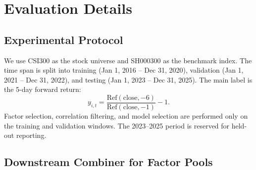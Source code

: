 



\section{Evaluation Details}
\label{sec:appendix_eval_details}

\subsection{Experimental Protocol}
\label{sec:appendix_exp_setup}

We use CSI300 as the stock universe and SH000300 as the benchmark index. The time span is split into training (Jan 1, 2016 -- Dec 31, 2020), validation (Jan 1, 2021 -- Dec 31, 2022), and testing (Jan 1, 2023 -- Dec 31, 2025). The main label is the 5-day forward return:
\begin{equation}
y_{i,t}=\frac{\mathrm{Ref}(\mathrm{close},-6)}{\mathrm{Ref}(\mathrm{close},-1)}-1.
\end{equation}
Factor selection, correlation filtering, and model selection are performed only on the training and validation windows. The 2023--2025 period is reserved for held-out reporting.

\subsection{Downstream Combiner for Factor Pools}

